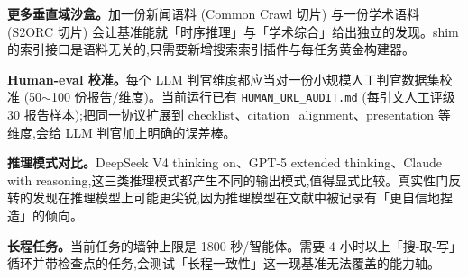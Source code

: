 \documentclass[UTF8,a4paper,12pt,oneside]{ctexart}
\begin{document}
\textbf{更多垂直域沙盒。}加一份新闻语料 (Common Crawl 切片) 与一份学术语料 (S2ORC 切片) 会让基准能就「时序推理」与「学术综合」给出独立的发现。shim 的索引接口是语料无关的,只需要新增搜索索引插件与每任务黄金构建器。

\textbf{Human-eval 校准。}每个 LLM 判官维度都应当对一份小规模人工判官数据集校准 (50\(\sim\)100 份报告/维度)。当前运行已有 \texttt{HUMAN\_URL\_AUDIT.md} (每引文人工评级 30 报告样本);把同一协议扩展到 checklist、citation\_alignment、presentation 等维度,会给 LLM 判官加上明确的误差棒。

\textbf{推理模式对比。}DeepSeek V4 thinking on、GPT-5 extended thinking、Claude with reasoning,这三类推理模式都产生不同的输出模式,值得显式比较。真实性门反转的发现在推理模型上可能更尖锐,因为推理模型在文献中被记录有「更自信地捏造」的倾向。

\textbf{长程任务。}当前任务的墙钟上限是 1800 秒/智能体。需要 4 小时以上「搜-取-写」循环并带检查点的任务,会测试「长程一致性」这一现基准无法覆盖的能力轴。
\end{document}
